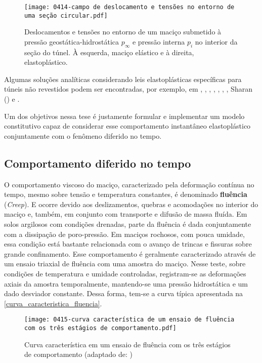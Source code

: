 \begin{figure}[H]
	\begin{center}
		\texttt{[image: 0414-campo de deslocamento e tensões no entorno de uma seção circular.pdf]}
	\end{center}
	\caption{\label{deslocamentos_tensoes_analitico}Deslocamentos e tensões no entorno de um maciço submetido à pressão geostática-hidrostática $p_{\infty}$ e pressão interna $p_i$ no interior da seção do túnel. À esquerda, maciço elástico e à direita, elastoplástico.}
\end{figure}

Algumas soluções analíticas considerando leis elastoplásticas específicas para túneis não revestidos podem ser encontradas, por exemplo, em , , , , , , , Sharan (\citeyear{Sharan2003,Sharan2005}) e .

Um dos objetivos nessa tese é justamente formular e implementar um modelo constitutivo capaz de considerar esse comportamento instantâneo elastoplástico conjuntamente com o fenômeno diferido no tempo.

\subsection{Comportamento diferido no tempo}

O comportamento viscoso do maciço, caracterizado pela deformação contínua no tempo, mesmo sobre tensão e temperatura constantes, é denominado \textbf{fluência} (\textit{Creep}). E ocorre devido aos deslizamentos, quebras e acomodações no interior do maciço e, também, em conjunto com transporte e difusão de massa fluída. Em solos argilosos com condições drenadas, parte da fluência é dada conjuntamente com a dissipação de poro-pressão. Em maciços rochosos, com pouca umidade, essa condição está bastante relacionada com o avanço de trincas e fissuras sobre grande confinamento. Esse comportamento é geralmente caracterizado através de um ensaio triaxial de fluência com uma amostra do maciço. Nesse teste, sobre condições de temperatura e umidade controladas, registram-se as deformações axiais da amostra temporalmente, mantendo-se uma pressão hidrostática e um dado desviador constante. Dessa forma, tem-se a curva típica apresentada na \autoref{curva_caracteristica_fluencia}.

\begin{figure}[H]
	\begin{center}
		\texttt{[image: 0415-curva característica de um ensaio de fluência com os três estágios de comportamento.pdf]}
	\end{center}
	\caption{\label{curva_caracteristica_fluencia}Curva característica em um ensaio de fluência com os três estágios de comportamento (adaptado de: )}
\end{figure}

